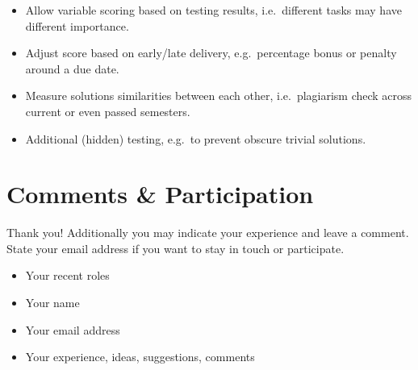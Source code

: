 \begin{itemize}
\item
  Allow variable scoring based on testing results, i.e.~different tasks may have different importance.
\item
  Adjust score based on early/late delivery, e.g.~percentage bonus or penalty around a due date.
\item
  Measure solutions similarities between each other, i.e.~plagiarism check across current or even passed semesters.
\item
  Additional (hidden) testing, e.g.~to prevent obscure trivial solutions.
\end{itemize}

\section{Comments \& Participation}\label{sec:comments-participation}

Thank you! Additionally you may indicate your experience and leave a comment. State your email address if you want to stay in touch or participate.

\begin{itemize}
\item
  Your recent roles
\item
  Your name
\item
  Your email address
\item
  Your experience, ideas, suggestions, comments
\end{itemize}
